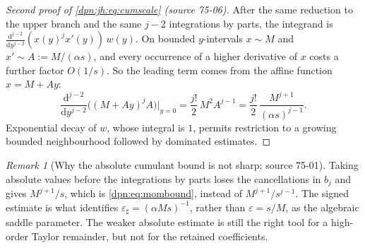 \documentclass[11pt]{article}
\numberwithin{equation}{section}
\theoremstyle{definition}\newtheorem{definition}[theorem]{Definition}
\theoremstyle{remark}\newtheorem{remark}[theorem]{Remark}
\newcommand{\eps}{\varepsilon}
\newcommand{\src}[1]{\textup{(source #1)}}
\newcommand{\epsh}{\varepsilon_{\sharp}}
\begin{document}
\begin{proof}[Second proof of \eqref{dpn:jh:eq:cumscale} \src{75-06}]
After the same reduction to the upper branch and the same $j-2$ integrations
by parts, the integrand is
$\frac{\mathrm d^{j-2}}{\mathrm dy^{j-2}}(x(y)^jx'(y))\,w(y)$.  On bounded
$y$-intervals $x\sim M$ and $x'\sim A:=M/(\alpha s)$, and every occurrence of a
higher derivative of $x$ costs a further factor $O(1/s)$.  So the leading term
comes from the affine function $x=M+Ay$:
\[
 \frac{\mathrm d^{j-2}}{\mathrm dy^{j-2}}\bigl((M+Ay)^jA\bigr)\Big|_{y=0}
 =\frac{j!}{2}\,M^2A^{j-1}
 =\frac{j!}{2}\,\frac{M^{j+1}}{(\alpha s)^{j-1}}.
\]
Exponential decay of $w$, whose integral is $1$, permits restriction to a
growing bounded neighbourhood followed by dominated estimates.
\end{proof}

\begin{remark}[Why the absolute cumulant bound is not sharp; source 75-01]\label{dpn:jh:rem:naive}
Taking absolute values before the integrations by parts loses the
cancellations in $b_j$ and gives $M^{j+1}/s$, which is
\eqref{dpn:eq:mombound}, instead of $M^{j+1}/s^{j-1}$.  The signed estimate is
what identifies $\epsh=(\alpha Ms)^{-1}$, rather than $\eps=s/M$, as the
algebraic saddle parameter.  The weaker absolute estimate is still the right
tool for a high-order Taylor remainder, but not for the retained coefficients.
\end{remark}
\end{document}
